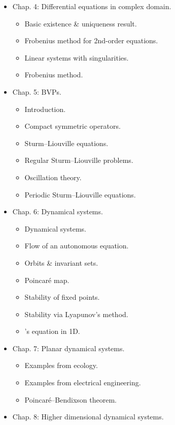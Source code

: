\documentclass{article}
\begin{document}
\begin{enumerate}
\begin{itemize}
		\item {\sf Chap. 4: Differential equations in complex domain.}
		\begin{itemize}
			\item {\sf Basic existence \& uniqueness result.}
			\item {\sf Frobenius method for 2nd-order equations.}
			\item {\sf Linear systems with singularities.}
			\item {\sf Frobenius method.}
		\end{itemize}
		\item {\sf Chap. 5: BVPs.}
		\begin{itemize}
			\item {\sf Introduction.}
			\item {\sf Compact symmetric operators.}
			\item {\sf Sturm--Liouville equations.}
			\item {\sf Regular Sturm--Liouville problems.}
			\item {\sf Oscillation theory.}
			\item {\sf Periodic Sturm--Liouville equations.}
		\end{itemize}
		\item {\sf Chap. 6: Dynamical systems.}
		\begin{itemize}
			\item {\sf Dynamical systems.}
			\item {\sf Flow of an autonomous equation.}
			\item {\sf Orbits \& invariant sets.}
			\item {\sf Poincar\'e map.}
			\item {\sf Stability of fixed points.}
			\item {\sf Stability via {\sc Lyapunov}'s method.}
			\item {'s equation in 1D.}
		\end{itemize}
		\item {\sf Chap. 7: Planar dynamical systems.}
		\begin{itemize}
			\item {\sf Examples from ecology.}
			\item {\sf Examples from electrical engineering.}
			\item {\sf Poincar\'e--Bendixson theorem.}
		\end{itemize}
		\item {\sf Chap. 8: Higher dimensional dynamical systems.}
		\begin{itemize}

\end{itemize}
\end{itemize}
\end{enumerate}
\end{document}
